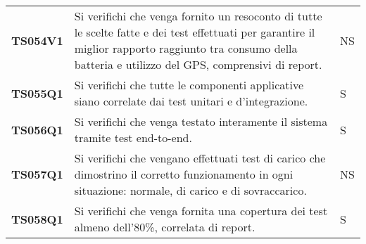 \documentclass[../../piano-di-qualifica.tex]{subfiles}
\begin{document}
\begin{longtable}[H]{>{\centering\bfseries}m{3cm} >{}m{10cm} >{\centering\arraybackslash}m{3cm}}
  TS054V1            & Si verifichi che venga fornito un resoconto di tutte le scelte fatte e dei test effettuati per garantire il miglior rapporto raggiunto tra consumo della batteria e utilizzo del GPS, comprensivi di report.
                     & NS \\

  TS055Q1            & Si verifichi che tutte le componenti applicative siano correlate dai test unitari e d'integrazione.
                     & S                                                                                                                                                                                                                                                               \\

  TS056Q1            & Si verifichi che venga testato interamente il sistema tramite test end-to-end.
                     & S                                                                                                                                                                                                                                                               \\

  TS057Q1            & Si verifichi che vengano effettuati test di carico che dimostrino il corretto funzionamento in ogni situazione: normale, di carico e di sovraccarico.
                     & NS                                                                                                                                                                                                                                                               \\

  TS058Q1            & Si verifichi che venga fornita una copertura dei test almeno dell'80\%, correlata di report.
                     & S                                                                                                                                                                                                                                                               \\                                                                                                                                                                                                                                                       



\end{longtable}
\end{document}
